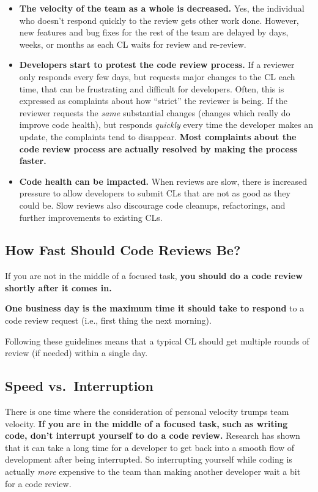 \documentclass[
]{article}
\providecommand{\tightlist}{%
  \setlength{\itemsep}{0pt}\setlength{\parskip}{0pt}}
\begin{document}
\begin{itemize}
\tightlist
\item
  \textbf{The velocity of the team as a whole is decreased.} Yes, the
  individual who doesn't respond quickly to the review gets other work
  done. However, new features and bug fixes for the rest of the team are
  delayed by days, weeks, or months as each CL waits for review and
  re-review.
\item
  \textbf{Developers start to protest the code review process.} If a
  reviewer only responds every few days, but requests major changes to
  the CL each time, that can be frustrating and difficult for
  developers. Often, this is expressed as complaints about how
  ``strict'' the reviewer is being. If the reviewer requests the
  \emph{same} substantial changes (changes which really do improve code
  health), but responds \emph{quickly} every time the developer makes an
  update, the complaints tend to disappear. \textbf{Most complaints
  about the code review process are actually resolved by making the
  process faster.}
\item
  \textbf{Code health can be impacted.} When reviews are slow, there is
  increased pressure to allow developers to submit CLs that are not as
  good as they could be. Slow reviews also discourage code cleanups,
  refactorings, and further improvements to existing CLs.
\end{itemize}

\subsection{How Fast Should Code Reviews Be?}\label{fast}

If you are not in the middle of a focused task, \textbf{you should do a
code review shortly after it comes in.}

\textbf{One business day is the maximum time it should take to respond}
to a code review request (i.e., first thing the next morning).

Following these guidelines means that a typical CL should get multiple
rounds of review (if needed) within a single day.

\subsection{Speed vs.~Interruption}\label{interruption}

There is one time where the consideration of personal velocity trumps
team velocity. \textbf{If you are in the middle of a focused task, such
as writing code, don't interrupt yourself to do a code review.} Research
has shown that it can take a long time for a developer to get back into
a smooth flow of development after being interrupted. So interrupting
yourself while coding is actually \emph{more} expensive to the team than
making another developer wait a bit for a code review.
\end{document}
